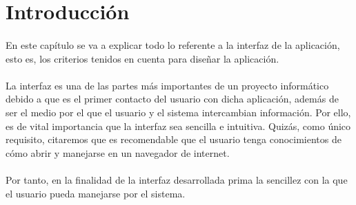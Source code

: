 \section{Introducción}

  \paragraph{}En este capítulo se va a explicar todo lo referente a la interfaz
  de la aplicación, esto es, los criterios tenidos en cuenta para diseñar la
  aplicación.

  \paragraph{}La interfaz es una de las partes más importantes de un proyecto
  informático debido a que es el primer contacto del usuario con dicha
  aplicación, además de ser el medio por el que el usuario y el sistema
  intercambian información. Por ello, es de vital importancia que la interfaz
  sea sencilla e intuitiva. Quizás, como único requisito, citaremos que es
  recomendable que el usuario tenga conocimientos de cómo abrir y manejarse en
  un navegador de internet.

  \paragraph{}Por tanto, en la finalidad de la interfaz desarrollada prima la
  sencillez con la que el usuario pueda manejarse por el sistema.